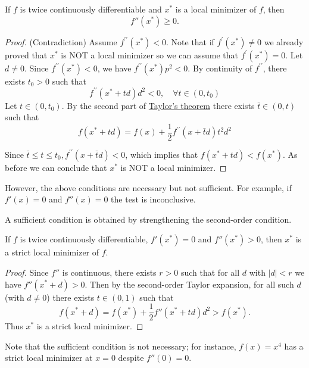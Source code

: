 \documentclass[9pt, headings=standardclasses, parskip=half]{scrartcl}
\begin{document}
\begin{theorem}
If \(f\) is twice continuously differentiable and \(x^*\) is a local minimizer of \(f\), then
\[
f''(x^*)\ge 0.
\]
\end{theorem}
\begin{proof}
(Contradiction)
Assume $f^{\prime \prime}\left(x^*\right)<0$. Note that if $f^{\prime}\left(x^*\right) \neq 0$ we already proved that $x^*$ is NOT a local minimizer so we can assume that $f^{\prime}\left(x^*\right)=0$. Let $d \neq 0$. Since $f^{\prime \prime}\left(x^*\right)<0$, we have $f^{\prime \prime}\left(x^*\right) p^2<0$. By continuity of $f^{\prime \prime}$, there exists $t_0>0$ such that
$$
f^{\prime \prime}\left(x^*+t d\right) d^2<0, \quad \forall t \in\left(0, t_0\right)
$$
Let $t \in\left(0, t_0\right)$. By the second part of \hyperref[thm:univariate_taylor_expansion]{Taylor's theorem} there exists $\bar{t} \in(0, t)$ such that
$$
f\left(x^*+t d\right)=f(x)+\frac{1}{2} f^{\prime \prime}(x+\bar{t} d) t^2 d^2
$$


Since $\bar{t} \leq t \leq t_0, f^{\prime \prime}(x+\bar{t} d)<0$, which implies that $f\left(x^*+t d\right)<f\left(x^*\right)$. As before we can conclude that $x^*$ is NOT a local minimizer.
\end{proof}

However, the above conditions are necessary but not sufficient. For example, if \(f'(x)=0\) and \(f''(x)=0\) the test is inconclusive.

A sufficient condition is obtained by strengthening the second-order condition.

\begin{theorem}
If \(f\) is twice continuously differentiable, \(f'(x^*)=0\) and \(f''(x^*)>0\), then \(x^*\) is a strict local minimizer of \(f\).
\end{theorem}
\begin{proof}
Since \(f''\) is continuous, there exists \(r>0\) such that for all \(d\) with \(|d|<r\) we have \(f''(x^*+d)>0\). 
Then by the second-order Taylor expansion, for all such \(d\) (with \(d\ne0\)) there exists \(t\in(0,1)\) such that
\[
f(x^*+d)=f(x^*)+\frac{1}{2}f''\left(x^*+t d\right)d^2>f(x^*).
\]
Thus \(x^*\) is a strict local minimizer.
\end{proof}

\begin{remark}
Note that the sufficient condition is not necessary; for instance, \(f(x)=x^4\) has a strict local minimizer at \(x=0\) despite \(f''(0)=0\).
\end{remark}
\end{document}
